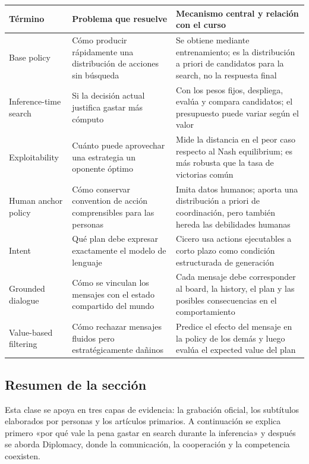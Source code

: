 \begin{longtable}{L{0.23\textwidth}L{0.30\textwidth}L{0.37\textwidth}}
\toprule
Término & Problema que resuelve & Mecanismo central y relación con el curso \\
\midrule
Base policy & Cómo producir rápidamente una distribución de acciones sin búsqueda & Se obtiene mediante entrenamiento; es la distribución a priori de candidatos para la search, no la respuesta final \\
Inference-time search & Si la decisión actual justifica gastar más cómputo & Con los pesos fijos, despliega, evalúa y compara candidatos; el presupuesto puede variar según el valor \\
Exploitability & Cuánto puede aprovechar una estrategia un oponente óptimo & Mide la distancia en el peor caso respecto al Nash equilibrium; es más robusta que la tasa de victorias común \\
Human anchor policy & Cómo conservar convention de acción comprensibles para las personas & Imita datos humanos; aporta una distribución a priori de coordinación, pero también hereda las debilidades humanas \\
Intent & Qué plan debe expresar exactamente el modelo de lenguaje & Cicero usa actions ejecutables a corto plazo como condición estructurada de generación \\
Grounded dialogue & Cómo se vinculan los mensajes con el estado compartido del mundo & Cada mensaje debe corresponder al board, la history, el plan y las posibles consecuencias en el comportamiento \\
Value-based filtering & Cómo rechazar mensajes fluidos pero estratégicamente dañinos & Predice el efecto del mensaje en la policy de los demás y luego evalúa el expected value del plan \\
\bottomrule
\end{longtable}

\subsection{Resumen de la sección}

Esta clase se apoya en tres capas de evidencia: la grabación oficial, los subtítulos elaborados por personas y los artículos primarios. A continuación se explica primero «por qué vale la pena gastar en search durante la inferencia» y después se aborda Diplomacy, donde la comunicación, la cooperación y la competencia coexisten.
